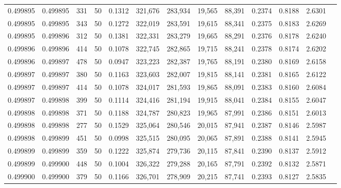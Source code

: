 \begin{tabular}{rrrrrrrrrrrrr}
0.499895 & 0.499895 &   331 &  50 &                                     0.1312 & 321,676 & 283,934 &  19,565 &  88,391 & 0.2374 & 0.8188 & 2.6301 \\
0.499895 & 0.499895 &   343 &  50 &                                     0.1272 & 322,019 & 283,591 &  19,615 &  88,341 & 0.2375 & 0.8183 & 2.6269 \\
0.499895 & 0.499896 &   312 &  50 &                                     0.1381 & 322,331 & 283,279 &  19,665 &  88,291 & 0.2376 & 0.8178 & 2.6240 \\
0.499896 & 0.499896 &   414 &  50 &                                     0.1078 & 322,745 & 282,865 &  19,715 &  88,241 & 0.2378 & 0.8174 & 2.6202 \\
0.499896 & 0.499897 &   478 &  50 &                                     0.0947 & 323,223 & 282,387 &  19,765 &  88,191 & 0.2380 & 0.8169 & 2.6158 \\
0.499897 & 0.499897 &   380 &  50 &                                     0.1163 & 323,603 & 282,007 &  19,815 &  88,141 & 0.2381 & 0.8165 & 2.6122 \\
0.499897 & 0.499897 &   414 &  50 &                                     0.1078 & 324,017 & 281,593 &  19,865 &  88,091 & 0.2383 & 0.8160 & 2.6084 \\
0.499897 & 0.499898 &   399 &  50 &                                     0.1114 & 324,416 & 281,194 &  19,915 &  88,041 & 0.2384 & 0.8155 & 2.6047 \\
0.499898 & 0.499898 &   371 &  50 &                                     0.1188 & 324,787 & 280,823 &  19,965 &  87,991 & 0.2386 & 0.8151 & 2.6013 \\
0.499898 & 0.499898 &   277 &  50 &                                     0.1529 & 325,064 & 280,546 &  20,015 &  87,941 & 0.2387 & 0.8146 & 2.5987 \\
0.499898 & 0.499899 &   451 &  50 &                                     0.0998 & 325,515 & 280,095 &  20,065 &  87,891 & 0.2388 & 0.8141 & 2.5945 \\
0.499899 & 0.499899 &   359 &  50 &                                     0.1222 & 325,874 & 279,736 &  20,115 &  87,841 & 0.2390 & 0.8137 & 2.5912 \\
0.499899 & 0.499900 &   448 &  50 &                                     0.1004 & 326,322 & 279,288 &  20,165 &  87,791 & 0.2392 & 0.8132 & 2.5871 \\
0.499900 & 0.499900 &   379 &  50 &                                     0.1166 & 326,701 & 278,909 &  20,215 &  87,741 & 0.2393 & 0.8127 & 2.5835 \\

\end{tabular}
